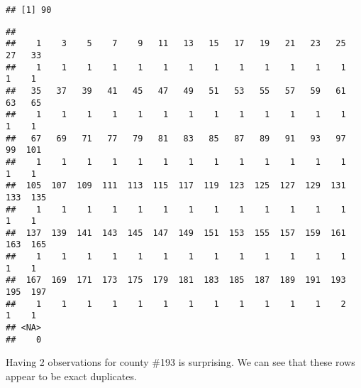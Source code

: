 \documentclass[]{article}
\newenvironment{Shaded}{\begin{snugshade}}{\end{snugshade}}
\newcommand{\DataTypeTok}[1]{\textcolor[rgb]{0.13,0.29,0.53}{#1}}
\newcommand{\DecValTok}[1]{\textcolor[rgb]{0.00,0.00,0.81}{#1}}
\newcommand{\KeywordTok}[1]{\textcolor[rgb]{0.13,0.29,0.53}{\textbf{#1}}}
\newcommand{\NormalTok}[1]{#1}
\newcommand{\OperatorTok}[1]{\textcolor[rgb]{0.81,0.36,0.00}{\textbf{#1}}}
\newcommand{\StringTok}[1]{\textcolor[rgb]{0.31,0.60,0.02}{#1}}
\begin{document}
\begin{Shaded}
\end{Shaded}

\begin{verbatim}
## [1] 90
\end{verbatim}

\begin{Shaded}
\end{Shaded}

\begin{verbatim}
## 
##    1    3    5    7    9   11   13   15   17   19   21   23   25   27   33 
##    1    1    1    1    1    1    1    1    1    1    1    1    1    1    1 
##   35   37   39   41   45   47   49   51   53   55   57   59   61   63   65 
##    1    1    1    1    1    1    1    1    1    1    1    1    1    1    1 
##   67   69   71   77   79   81   83   85   87   89   91   93   97   99  101 
##    1    1    1    1    1    1    1    1    1    1    1    1    1    1    1 
##  105  107  109  111  113  115  117  119  123  125  127  129  131  133  135 
##    1    1    1    1    1    1    1    1    1    1    1    1    1    1    1 
##  137  139  141  143  145  147  149  151  153  155  157  159  161  163  165 
##    1    1    1    1    1    1    1    1    1    1    1    1    1    1    1 
##  167  169  171  173  175  179  181  183  185  187  189  191  193  195  197 
##    1    1    1    1    1    1    1    1    1    1    1    1    2    1    1 
## <NA> 
##    0
\end{verbatim}

Having 2 observations for county \#193 is surprising. We can see that
these rows appear to be exact duplicates.

\begin{Shaded}
\end{Shaded}
\end{document}
